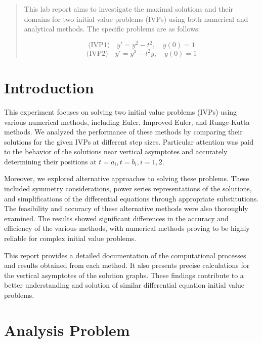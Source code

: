 \documentclass{article}
\begin{document}
\begin{abstract}

This lab report aims to investigate the maximal solutions and their domains for two initial value problems (IVPs) using both numerical and analytical methods. The specific problems are as follows: 

\begin{equation*}
    \text{(IVP1)} \quad y' = y^2 - t^2, \quad y(0) = 1
\end{equation*}
\begin{equation*}
    \text{(IVP2)} \quad y' = y^3 - t^2y, \quad y(0) = 1
\end{equation*}

\end{abstract}

\section{Introduction}

This experiment focuses on solving two initial value problems (IVPs) using various numerical methods, including Euler, Improved Euler, and Runge-Kutta methods. We analyzed the performance of these methods by comparing their solutions for the given IVPs at different step sizes. Particular attention was paid to the behavior of the solutions near vertical asymptotes and accurately determining their positions at \( t = a_i, t = b_i, i = 1, 2 \).

Moreover, we explored alternative approaches to solving these problems. These included symmetry considerations, power series representations of the solutions, and simplifications of the differential equations through appropriate substitutions. The feasibility and accuracy of these alternative methods were also thoroughly examined. The results showed significant differences in the accuracy and efficiency of the various methods, with numerical methods proving to be highly reliable for complex initial value problems.

This report provides a detailed documentation of the computational processes and results obtained from each method. It also presents precise calculations for the vertical asymptotes of the solution graphs. These findings contribute to a better understanding and solution of similar differential equation initial value problems.


\section{Analysis Problem }
\end{document}
